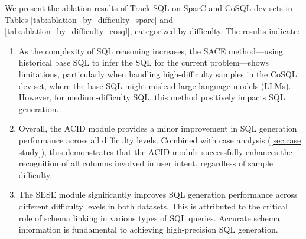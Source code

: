 \documentclass[11pt]{article}
\begin{document}
We present the ablation results of Track-SQL on SparC and CoSQL dev sets in Tables \ref{tab:ablation_by_difficulty_sparc} and \ref{tab:ablation_by_difficulty_cosql}, categorized by difficulty. The results indicate:
\begin{enumerate}
    \item As the complexity of SQL reasoning increases, the SACE method—using historical base SQL to infer the SQL for the current problem—shows limitations, particularly when handling high-difficulty samples in the CoSQL dev set, where the base SQL might mislead large language models (LLMs). However, for medium-difficulty SQL, this method positively impacts SQL generation.
    \item Overall, the ACID module provides a minor improvement in SQL generation performance across all difficulty levels. Combined with case analysis (\ref{sec:case study}), this demonstrates that the ACID module successfully enhances the recognition of all columns involved in user intent, regardless of sample difficulty.
    \item The SESE module significantly improves SQL generation performance across different difficulty levels in both datasets. This is attributed to the critical role of schema linking in various types of SQL queries. Accurate schema information is fundamental to achieving high-precision SQL generation.
\end{enumerate}
\end{document}
